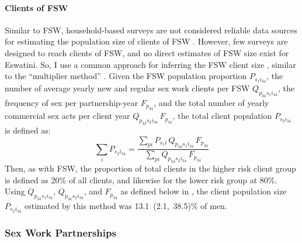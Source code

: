 \paragraph{Clients of FSW}
Similar to FSW, household-based surveys are not considered reliable data sources
for estimating the population size of clients of FSW \cite{Behanzin2013}.
However, few surveys are designed to reach clients of FSW,
and no direct estimates of FSW size exist for Eswatini.
So, I use a common approach for inferring the FSW client size \cite{Cote2004},
similar to the ``multiplier method'' \cite{Morison2001}.
Given the FSW population proportion $P_{s_{1}i_{34}}$,
the number of average yearly new and regular sex work clients per FSW $Q_{p_{34}s_{1}i_{34}}$,
the frequency of sex per partnership-year $F_{p_{34}}$, and
the total number of yearly commercial sex acts per client year $Q_{p_{34}s_{2}i_{34}}\,F_{p_{34}}$,
the total client population $P_{s_{2}i_{34}}$ is defined as:
\begin{equation}
  {\textstyle\sum_{i}} P_{s_{2}i_{34}} =
  \frac{\sum_{pi} P_{s_{1}i}\,Q_{p_{34}s_{1}i_{34}}\,F_{p_{34}}}
       {\sum_{pi}             Q_{p_{34}s_{2}i_{34}}\,F_{p_{34}}}
  \label{eq:model.fsw.cli.tot}
\end{equation}
Then, as with FSW, the proportion of total clients in the higher risk client group
is defined as 20\% of all clients, and likewise for the lower risk group at 80\%.
Using $Q_{p_{34}s_{1}i_{34}}$, $Q_{p_{34}s_{2}i_{34}}$, and $F_{p_{34}}$
as defined below in , the client population size $P_{s_{2}i_{34}}$
estimated by this method was 13.1~(2.1,~38.5)\% of men. %
\subsubsection{Sex Work Partnerships}\label{model.par.sw.part}
